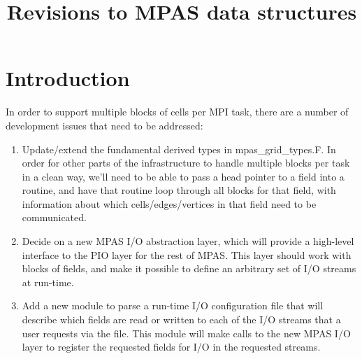 \documentclass[11pt]{report}
\begin{document}
\title{Revisions to MPAS data structures}
\author{}

\maketitle
\tableofcontents


%
%
\chapter{Introduction}

In order to support multiple blocks of cells per MPI task, there are a number of
development issues that need to be addressed:

\begin{enumerate}

\item Update/extend the fundamental derived types in mpas\_grid\_types.F.                                
   In order for other parts of the infrastructure to handle multiple                                
   blocks per task in a clean way, we'll need to be able to pass a head                             
   pointer to a field into a routine, and have that routine loop through                            
   all blocks for that field, with information about which cells/edges/vertices                     
   in that field need to be communicated.                                                           
                                                                                                    
\item Decide on a new MPAS I/O abstraction layer, which will provide a                                
   high-level interface to the PIO layer for the rest of MPAS. This layer                           
   should work with blocks of fields, and make it possible to define an                             
   arbitrary set of I/O streams at run-time.                                                        
                                                                                                    
\item Add a new module to parse a run-time I/O configuration file that                                
   will describe which fields are read or written to each of the I/O                                
   streams that a user requests via the file. This module will make calls                           
   to the new MPAS I/O layer to register the requested fields for I/O in                            
   the requested streams.                                          
   

\end{enumerate}
\end{document}
